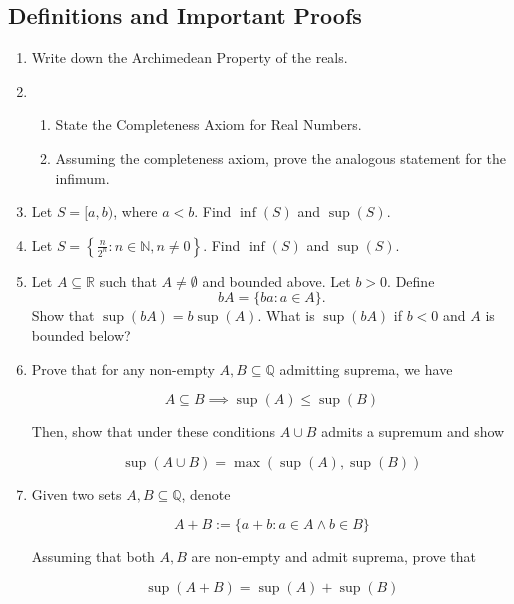\documentclass{article}
\theoremstyle{definition}
\begin{document}
\subsection{Definitions and Important Proofs}

\begin{enumerate}

    \item Write down the Archimedean Property of the reals.

    \item 
    
        \begin{enumerate}
        \item State the Completeness Axiom for Real Numbers.
        \item Assuming the completeness axiom, prove the analogous statement for the infimum.
        \end{enumerate}


    \item Let \( S = [a, b) \), where \( a < b \). Find \( \inf(S) \) and \( \sup(S) \).

    \item 
    Let \( S = \left\{ \frac{n}{2^{n}} : n \in \mathbb{N}, n \neq 0 \right\} \). Find \( \inf(S) \) and \( \sup(S) \).

    \item
    Let \( A \subseteq \mathbb{R} \) such that \( A \neq \emptyset \) and bounded above. Let \( b > 0 \). Define 
    \[ 
    bA = \{ba : a \in A\}.
    \]
    Show that \( \sup(bA) = b\sup(A) \). What is \( \sup(bA) \) if \( b < 0 \) and \( A \) is bounded below?

    \item Prove that for any non-empty $A,B \subseteq \mathbb{Q}$ admitting suprema, we have 

    \[ A \subseteq B \implies \sup(A) \leq \sup(B)\]

    Then, show that under these conditions $A \cup B$ admits a supremum and show

    \[ \sup(A \cup B) = \max(\sup(A), \sup(B))\]
    \item 

    Given two sets $A,B \subseteq \mathbb{Q}$, denote 

    \[ A + B := \{a + b : a \in A \land b \in B \}\]

    Assuming that both $A,B$ are non-empty and admit suprema, prove that 

    \[ \sup(A + B) = \sup(A) + \sup(B)\]
\end{enumerate}
\end{document}
